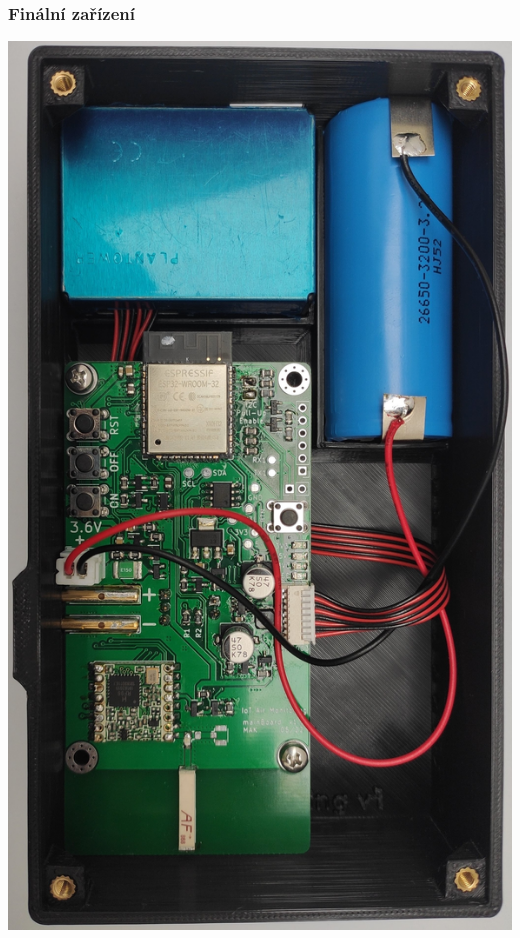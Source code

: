 \documentclass[%
  12pt,       				%
	t,                  %
	aspectratio=1610,   %
	unicode,						%
]{beamer}				    	%
\begin{document}
\begin{frame}
	\frametitle{Finální zařízení}
	\centering
	\includegraphics[height=0.8\textheight]{obrazky/finalDevice.jpg}	

\end{frame}

\end{document}
